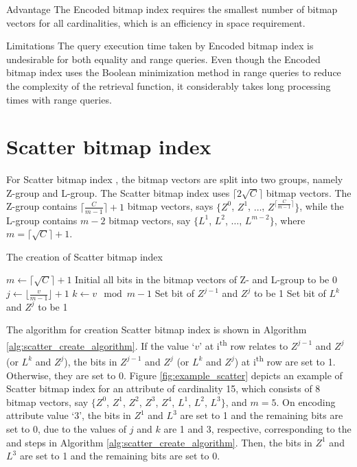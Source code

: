 \documentclass[../main/thesis.tex]{subfiles}
\begin{document}
\begin{prosNcons}{Advantage}
	The Encoded bitmap index requires the smallest number of bitmap vectors for all cardinalities, which is an efficiency in space requirement.
\end{prosNcons}

\begin{prosNcons}{Limitations}
	The query execution time taken by Encoded bitmap index is undesirable for both equality and range queries. Even though the Encoded bitmap index uses the Boolean minimization method in range queries to reduce the complexity of the retrieval function, it considerably takes long processing times with range queries.
\end{prosNcons}


\section{Scatter bitmap index}
For Scatter bitmap index \cite{ScatterBI}, the bitmap vectors are split into two groups, namely Z-group and L-group. The Scatter bitmap index uses $\lceil 2\sqrt{C}\rceil$ bitmap vectors. The Z-group contains $\lceil\frac{C}{m-1}\rceil + 1$ bitmap vectors, says $\{Z^0$, $Z^1$, $\dots$, $Z^{\lceil\frac{C}{m-1}\rceil}\}$, while the L-group contains $m-2$ bitmap vectors, say $\{L^1$, $L^2$, $\dots$, $L^{m-2}\}$, where $m = \lceil\sqrt{C} \rceil + 1$.

\begin{algorithm}[ht]
	\caption{The creation of Scatter bitmap index}
	\label{alg:scatter_create_algorithm}
	\begin{algorithmic}[1]
		\State $m \gets \lceil\sqrt{C}\rceil + 1$
		\State Initial all bits in the bitmap vectors of Z- and L-group to be 0
		\State $j \gets \lfloor \frac{v}{m-1} \rfloor +1$ 
		\State $k \gets v \mod m-1$
		\State Set bit of $Z^{j-1}$ and $Z^j$ to be 1
		\Else
		\State Set bit of $L^k$ and $Z^j$ to be 1
		\EndIf
		\ENDFOR
	\end{algorithmic}
\end{algorithm}

The algorithm for creation Scatter bitmap index is shown in Algorithm \ref{alg:scatter_create_algorithm}. If the value `$v$' at i\textsuperscript{th} row relates to $Z^{j-1}$ and $Z^j$ (or $L^k$ and $Z^j$), the bits in $Z^{j-1}$ and $Z^j$ (or $L^k$ and $Z^j$) at i\textsuperscript{th} row are set to 1. Otherwise, they are set to 0. Figure \ref{fig:example_scatter} depicts an example of Scatter bitmap index for an attribute of cardinality 15, which consists of 8 bitmap vectors, say $\{Z^0$, $Z^1$, $Z^2$, $Z^3$, $Z^4$, $L^1$, $L^2$, $L^3\}$, and $m=5$. On encoding attribute value `3', the bits in $Z^1$ and $L^3$ are set to 1 and the remaining bits are set to 0, due to the values of $j$ and $k$ are 1 and 3, respective, corresponding to the  and  steps in Algorithm \ref{alg:scatter_create_algorithm}. Then, the bits in $Z^1$ and $L^3$ are set to 1 and the remaining bits are set to 0.
\end{document}
